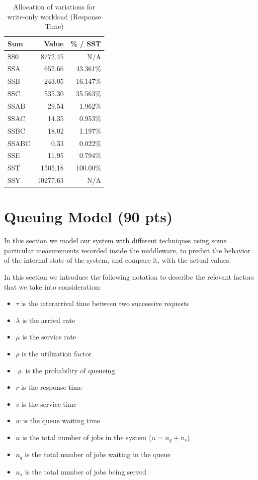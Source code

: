 \documentclass[11pt,a4paper]{article}
\begin{document}
\begin{table}[!htb]
  \centering
    \caption{Allocation of variations for write-only workload (Response Time)}
  \label{tab:wo_variation}
  \small{
    \begin{tabular}{|l|r|r|}
        \hline \textbf{Sum}   & \textbf{Value}        & \textbf{\% / SST} \\
      \hline SS0   & 8772.45       & N/A      \\
      \hline SSA   & 652.66        & 43.361\%  \\
      \hline SSB   & 243.05        & 16.147\% \\
      \hline SSC   & 535.30        & 35.563\% \\
      \hline SSAB  & 29.54         & 1.962\%  \\
      \hline SSAC  & 14.35         & 0.953\%  \\
      \hline SSBC  & 18.02         & 1.197\%  \\
      \hline SSABC & 0.33          & 0.022\%  \\
      \hline SSE   & 11.95         & 0.794\%  \\
      \hline SST   & 1505.18       & 100.00\% \\
      \hline SSY   & 10277.63      & N/A      \\
      \hline
    \end{tabular}
  }
\end{table}

\newpage
\section{Queuing Model (90 pts)}

In this section we model our system with different techniques using some particular measurements recorded inside the middleware, to predict the behavior of the internal state of the system, and compare it, with the actual values.

In this section we introduce the following notation to describe the relevant factors that we take into consideration:

\begin{itemize}
    \item $\tau$ is the interarrival time between two successive requests
    \item $\lambda$ is the arrival rate
    \item $\mu$ is the service rate
    \item $\rho$ is the utilization factor
    \item $\varrho$ is the probability of queueing
    \item $r$ is the response time
    \item $s$ is the service time
    \item $w$ is the queue waiting time
    \item $n$ is the total number of jobs in the system ($n = n_q + n_s$)
    \item $n_q$ is the total number of jobs waiting in the queue
    \item $n_s$ is the total number of jobs being served
\end{itemize}
\end{document}

